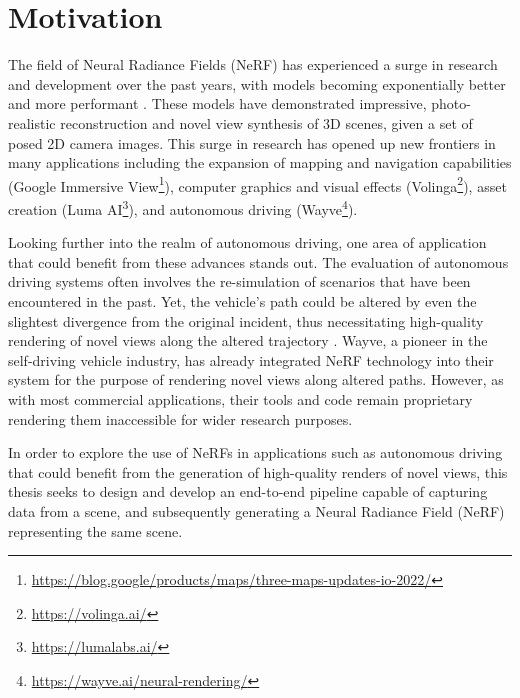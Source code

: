 \section{Motivation}
The field of Neural Radiance Fields (NeRF) has experienced a surge in research and development over the past years, with models becoming exponentially better and more performant \cite{debbagh_neural_2023}. These models have demonstrated impressive, photo-realistic reconstruction and novel view synthesis of 3D scenes, given a set of posed 2D camera images. This surge in research has opened up new frontiers in many applications including the expansion of mapping and navigation capabilities (Google Immersive View\footnote{\url{https://blog.google/products/maps/three-maps-updates-io-2022/}}), computer graphics and visual effects (Volinga\footnote{\url{https://volinga.ai/}}), asset creation (Luma AI\footnote{\url{https://lumalabs.ai/}}), and autonomous driving (Wayve\footnote{\url{https://wayve.ai/neural-rendering/}}). 

\begin{comment}
Looking deeper into autonomous driving, one of the many applications where NeRF could prove beneficial
"Let's look further into one of the applications where NeRF could be beneficial, e.g. autonomous driving."
Looking deeper into autonomous driving, an application that could benefit from these advances
Zooming in on an application that could benefit from these advances, autonomous driving fits well.
\end{comment}


Looking further into the realm of autonomous driving, one area of application that could benefit from these advances stands out. The evaluation of autonomous driving systems often involves the re-simulation of scenarios that have been encountered in the past. Yet, the vehicle's path could be altered by even the slightest divergence from the original incident, thus necessitating high-quality rendering of novel views along the altered trajectory \cite{tancikBlockNeRFScalableLarge2022}. Wayve, a pioneer in the self-driving vehicle industry, has already integrated NeRF technology into their system for the purpose of rendering novel views along altered paths. However, as with most commercial applications, their tools and code remain proprietary rendering them inaccessible for wider research purposes.

In order to explore the use of NeRFs in applications such as autonomous driving that could benefit from the generation of high-quality renders of novel views, this thesis seeks to design and develop an end-to-end pipeline capable of capturing data from a scene, and subsequently generating a Neural Radiance Field (NeRF) representing the same scene. 

